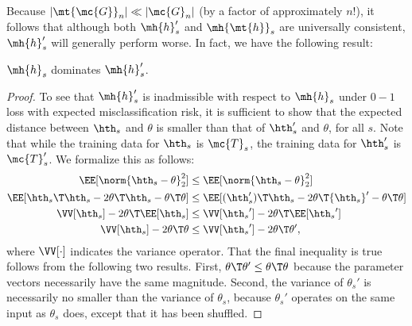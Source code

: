\documentclass[10pt,journal,cspaper,compsoc]{IEEEtran}
\begin{document}
Because $|\mt{\mc{G}}_n| \ll |\mc{G}_n|$ (by a factor of approximately $n!$), it follows that although both $\mh{h}_s'$ and $\mh{\mt{h}}_s$ are universally consistent, $\mh{h}_s'$ will generally perform worse.  In fact, we have the following result:
\begin{thm} \label{thm:inadmiss}
	$\mh{h}_s$ dominates $\mh{h}_s'$. 
\end{thm}
\begin{proof}
	To see that $\mh{h}_s'$ is inadmissible with respect to $\mh{h}_s$ under $0-1$ loss with expected misclassification risk, it is sufficient to show that the expected distance between  $\hth_s$ and $\theta$ is smaller than that of $\hth_s'$ and $\theta$, for all $s$. Note that while the training data for $\hth_s$ is $\mc{T}_s$, the training data for $\hth_s'$ is $\mc{T}_s'$. We formalize this as follows:
	\begin{subequations}
	\begin{align}
		\EE[\norm{\hth_s - \theta}_2^2] &\leq \EE[\norm{\hth_s - \theta}_2^2] \\
		\EE[{\hth_s}\T \hth_s - 2 \theta\T \hth_s - \theta\T \theta ] &\leq 	\EE[(\hth_s')\T \hth_s - 2 \theta\T {\hth_s}' - \theta\T \theta ] \\
		\VV[\hth_s] -2 \theta\T \EE[\hth_s] &\leq 	\VV[{\hth_s}'] -2 \theta\T \EE[{\hth_s}'] \\
		\VV[\hth_s] -2 \theta\T\theta &\leq 	\VV[{\hth_s}'] -2 \theta\T\theta',
	\end{align}
\end{subequations}
	where $\VV[\cdot]$ indicates the variance operator. That the final inequality is true follows from the following two results.  First, $\theta\T \theta' \leq \theta\T \theta$ because the parameter vectors necessarily have the same magnitude.  Second, the variance of $\theta_s'$ is necessarily no smaller than the variance of $\theta_s$, because $\theta_s'$ operates on the same input as $\theta_s$ does, except that it has been shuffled.
\end{proof}
\end{document}
